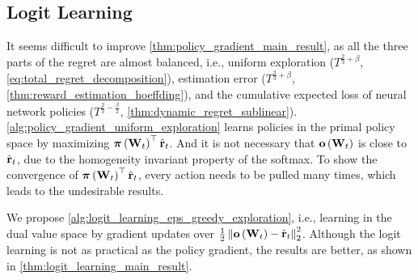 \subsection{Logit Learning}
\label{subsec:theoretical_analyses_logit_learning}

It seems difficult to improve \cref{thm:policy_gradient_main_result}, as all the three parts of the regret are almost balanced, i.e., uniform exploration ($ T^{\frac{2}{3} + \beta}$, \cref{eq:total_regret_decomposition}), estimation error ($ T^{\frac{2}{3} + \beta} $, \cref{thm:reward_estimation_hoeffding}), and the cumulative expected loss of neural network policies ($ T^{\frac{2}{3} - \frac{\beta}{2}} $, \cref{thm:dynamic_regret_sublinear}). \cref{alg:policy_gradient_uniform_exploration} learns policies in the primal policy space by maximizing ${\boldsymbol{\pi}}\left( {\mathbf{W}}_t \right)^\top \hat{{\mathbf{r}}}_t$. And it is not necessary that ${\mathbf{o}}\left( {\mathbf{W}}_t\right)$ is close to $\hat{{\mathbf{r}}}_t$, due to the homogeneity invariant property of the softmax. To show the convergence of ${\boldsymbol{\pi}}\left( {\mathbf{W}}_t \right)^\top \hat{{\mathbf{r}}}_t$, every action needs to be pulled many times, which leads to the undesirable results.

We propose \cref{alg:logit_learning_eps_greedy_exploration}, i.e., learning in the dual value space by gradient updates over $\frac{1}{2} \left\| {\mathbf{o}}\left( {\mathbf{W}}_t\right) - \hat{{\mathbf{r}}}_t \right\|_2^2$. Although the logit learning is not as practical as the policy gradient, the results are better, as shown in \cref{thm:logit_learning_main_result}.

